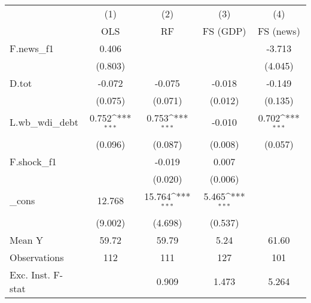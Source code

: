 {
\def\sym#1{\ifmmode^{#1}\else\(^{#1}\)\fi}
\begin{tabular}{l*{4}{c}}
\toprule
            &\multicolumn{1}{c}{(1)}&\multicolumn{1}{c}{(2)}&\multicolumn{1}{c}{(3)}&\multicolumn{1}{c}{(4)}\\
            &\multicolumn{1}{c}{OLS}&\multicolumn{1}{c}{RF}&\multicolumn{1}{c}{FS (GDP)}&\multicolumn{1}{c}{FS (news)}\\
\midrule
F.news\_f1   &       0.406         &                     &                     &      -3.713         \\
            &     (0.803)         &                     &                     &     (4.045)         \\
\addlinespace
D.tot       &      -0.072         &      -0.075         &      -0.018         &      -0.149         \\
            &     (0.075)         &     (0.071)         &     (0.012)         &     (0.135)         \\
\addlinespace
L.wb\_wdi\_debt&       0.752\sym{***}&       0.753\sym{***}&      -0.010         &       0.702\sym{***}\\
            &     (0.096)         &     (0.087)         &     (0.008)         &     (0.057)         \\
\addlinespace
F.shock\_f1  &                     &      -0.019         &       0.007         &                     \\
            &                     &     (0.020)         &     (0.006)         &                     \\
\addlinespace
\_cons      &      12.768         &      15.764\sym{***}&       5.465\sym{***}&                     \\
            &     (9.002)         &     (4.698)         &     (0.537)         &                     \\
\midrule
Mean Y      &       59.72         &       59.79         &        5.24         &       61.60         \\
Observations&         112         &         111         &         127         &         101         \\
Exc. Inst. F-stat&                     &       0.909         &       1.473         &       5.264         \\
\bottomrule
\end{tabular}
}
